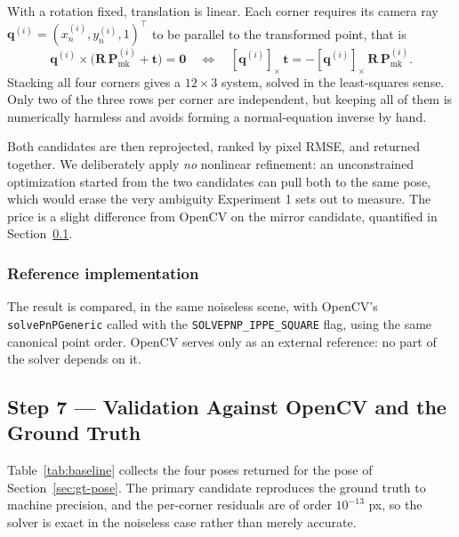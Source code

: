\documentclass[11pt,a4paper]{article}
\theoremstyle{definition}
\theoremstyle{plain}
\theoremstyle{remark}
\newcommand{\code}[1]{\texttt{#1}}
\newcommand{\flag}{\texttt{SOLVEPNP\allowbreak\_IPPE\allowbreak\_SQUARE}}
\newcommand{\Pmark}{\mathbf{P}_{\text{mk}}}
\begin{document}
With a rotation fixed, translation is linear. Each corner requires its camera
ray $\mathbf{q}^{(i)} = (x_n^{(i)}, y_n^{(i)}, 1)^\top$ to be parallel to the
transformed point, that is
\begin{equation}
  \mathbf{q}^{(i)} \times \big(\mathbf{R}\,\Pmark^{(i)} + \mathbf{t}\big)
  = \mathbf{0}
  \quad\Longleftrightarrow\quad
  [\mathbf{q}^{(i)}]_\times\,\mathbf{t}
  = -[\mathbf{q}^{(i)}]_\times\,\mathbf{R}\,\Pmark^{(i)} .
\end{equation}
Stacking all four corners gives a $12\times3$ system, solved in the
least-squares sense. Only two of the three rows per corner are independent, but
keeping all of them is numerically harmless and avoids forming a normal-equation
inverse by hand.

Both candidates are then reprojected, ranked by pixel RMSE, and returned
together. We deliberately apply \emph{no} nonlinear refinement: an
unconstrained optimization started from the two candidates can pull both to the
same pose, which would erase the very ambiguity Experiment 1 sets out to
measure. The price is a slight difference from OpenCV on the mirror candidate,
quantified in Section~\ref{sec:step7}.

\subsubsection{Reference implementation}

The result is compared, in the same noiseless scene, with OpenCV's
\code{solvePnPGeneric} called with the \flag{} flag, using the same canonical
point order. OpenCV serves only as an external reference: no part of the solver
depends on it.

\subsection{Step 7 --- Validation Against OpenCV and the Ground Truth}
\label{sec:step7}

Table~\ref{tab:baseline} collects the four poses returned for the pose of
Section~\ref{sec:gt-pose}. The primary candidate reproduces the ground truth to machine
precision, and the per-corner residuals are of order $10^{-13}$ px, so the
solver is exact in the noiseless case rather than merely accurate.
\end{document}
